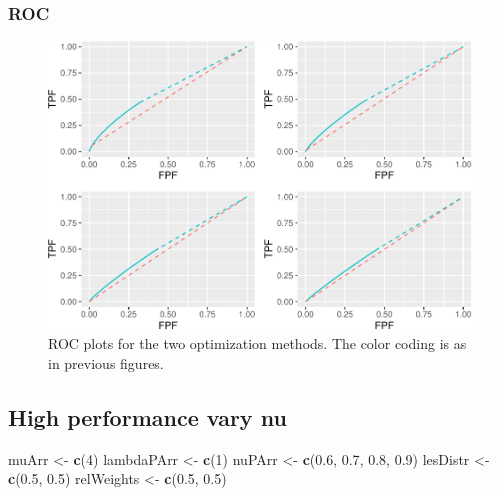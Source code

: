 \documentclass[
]{book}
\newenvironment{Shaded}{\begin{snugshade}}{\end{snugshade}}
\newcommand{\DecValTok}[1]{\textcolor[rgb]{0.00,0.00,0.81}{#1}}
\newcommand{\FloatTok}[1]{\textcolor[rgb]{0.00,0.00,0.81}{#1}}
\newcommand{\KeywordTok}[1]{\textcolor[rgb]{0.13,0.29,0.53}{\textbf{#1}}}
\newcommand{\NormalTok}[1]{#1}
\newcommand{\StringTok}[1]{\textcolor[rgb]{0.31,0.60,0.02}{#1}}
\begin{document}
\hypertarget{roc-8}{%
\subsubsection{ROC}\label{roc-8}}

\begin{figure}
\centering
\includegraphics{22-optim-op-point_files/figure-latex/optim-op-point-low-performance-vary-lambda-vary-all-roc-1.pdf}
\caption{\label{fig:optim-op-point-low-performance-vary-lambda-vary-all-roc}ROC plots for the two optimization methods. The color coding is as in previous figures.}
\end{figure}

\hypertarget{optim-op-point-high-performance-vary-nu}{%
\subsection{High performance vary nu}\label{optim-op-point-high-performance-vary-nu}}

\begin{Shaded}
\begin{Highlighting}[]
\NormalTok{muArr <-}\StringTok{ }\KeywordTok{c}\NormalTok{(}\DecValTok{4}\NormalTok{)}
\NormalTok{lambdaPArr <-}\StringTok{ }\KeywordTok{c}\NormalTok{(}\DecValTok{1}\NormalTok{)}
\NormalTok{nuPArr <-}\StringTok{ }\KeywordTok{c}\NormalTok{(}\FloatTok{0.6}\NormalTok{, }\FloatTok{0.7}\NormalTok{, }\FloatTok{0.8}\NormalTok{, }\FloatTok{0.9}\NormalTok{)}
\NormalTok{lesDistr <-}\StringTok{ }\KeywordTok{c}\NormalTok{(}\FloatTok{0.5}\NormalTok{, }\FloatTok{0.5}\NormalTok{)}
\NormalTok{relWeights <-}\StringTok{ }\KeywordTok{c}\NormalTok{(}\FloatTok{0.5}\NormalTok{, }\FloatTok{0.5}\NormalTok{)}
\end{Highlighting}
\end{Shaded}
\end{document}
